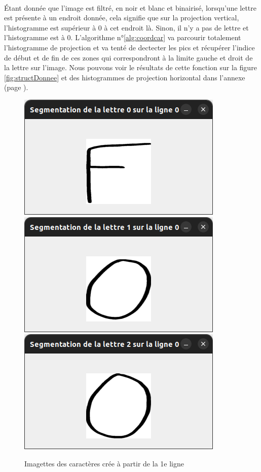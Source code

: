 \documentclass[a4paper]{article}
\begin{document}
			\paragraph{} Étant donnée que l'image est filtré, en noir et blanc et binairisé, lorsqu'une lettre est présente à un endroit donnée, cela signifie que sur la projection vertical, l'histogramme est supérieur à 0 à cet endroit là. Sinon, il n'y a pas de lettre et l'histogramme est à 0. L'algorithme n°\ref{alg:coordcar} va parcourir totalement l'histogramme de projection et va tenté de dectecter les pics et récupérer l'indice de début et de fin de ces zones qui correspondront à la limite gauche et droit de la lettre sur l'image. Nous pouvons voir le résultats de cette fonction sur la figure \ref{fig:structDonnee} et des histogrammes de projection horizontal dans l'annexe (page \pageref{fig:histoX1}).
			\begin{figure}
				\caption{Imagettes des caractères crée à partir de la 1e ligne}
				\includegraphics[scale=.3]{segmentation_F.png}
				\centering
				\includegraphics[scale=.3]{segmentation_O1.png}
				\centering
				\includegraphics[scale=.3]{segmentation_O2.png}
				\centering
			\end{figure}
\end{document}
